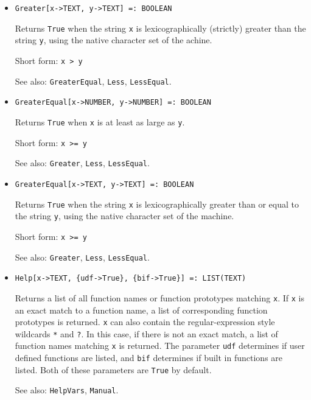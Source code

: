 \begin{itemize}
\item{}
\protect \large \begin{verbatim}
Greater[x->TEXT, y->TEXT] =: BOOLEAN 
\end{verbatim}\normalsize

\bd
Returns \verb+True+ when the string \verb+x+ is lexicographically (strictly)
greater than the string \verb+y+, using the native character set of the 
achine.
\item
[Short form:] \verb+x > y+
\item
[See also:] \verb+GreaterEqual+, \verb+Less+, \verb+LessEqual+.
\ed

\item{}
\protect \large \begin{verbatim}
GreaterEqual[x->NUMBER, y->NUMBER] =: BOOLEAN 
\end{verbatim}\normalsize

\bd
Returns \verb+True+ when \verb+x+ is at least as large as \verb+y+.
\item
[Short form:] \verb+x >= y+
\item
[See also:] \verb+Greater+, \verb+Less+, \verb+LessEqual+.
\ed

\item{}
\protect \large \begin{verbatim}
GreaterEqual[x->TEXT, y->TEXT] =: BOOLEAN 
\end{verbatim}\normalsize

\bd
Returns \verb+True+ when the string \verb+x+ is lexicographically greater than
or equal to the string \verb+y+, using the native character set of the
machine.
\item
[Short form:] \verb+x >= y+
\item
[See also:] {\tt Greater}, {\tt Less}, {\tt LessEqual}.
\ed



\item{}
\protect \large \begin{verbatim}
Help[x->TEXT, {udf->True}, {bif->True}] =: LIST(TEXT) 
\end{verbatim}\normalsize

\bd 
Returns a list of all function names or function prototypes matching
\verb+x+.  If \verb+x+ is an exact match to a function name, a list of
corresponding function prototypes is returned.  \verb+x+ can also
contain the regular-expression style wildcards \verb+*+ and \verb+?+.
In this case, if there is not an exact match, a list of function names
matching \verb+x+ is returned.  The parameter \verb+udf+ determines if
user defined functions are listed, and \verb+bif+ determines if built
in functions are listed.  Both of these parameters are \verb+True+ by
default.
\item
[See also:] \verb+HelpVars+, \verb+Manual+.
\ed


\end{itemize}
